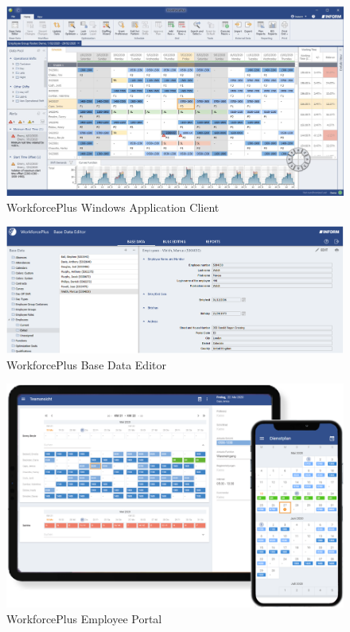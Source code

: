 
\begin{figure}[H]
	\centering	
	\includegraphics[width=.5\textwidth]{img/workforcePlusWindowsApplication.png}
	\caption[WorkforcePlus Windows Application Client]{WorkforcePlus Windows Application Client\cite{clients}}
	\label{fig:workforcePlusClient}
\end{figure}
\begin{figure}[H]
	\centering	
	\includegraphics[width=.5\textwidth]{img/workforcePlusBaseDataEditor.png}
	\caption[WorkforcePlus Base Data Editor]{WorkforcePlus Base Data Editor\cite{clients}}
	\label{fig:workforcePlusBaseDataEditor}
\end{figure}
\begin{figure}[H]
	\centering	
	\includegraphics[width=.5\textwidth]{img/workForcePlusEmployeePortal.png}
	\caption[WorkforcePlus Employee Portal]{WorkforcePlus Employee Portal\cite{clients}}
	\label{fig:workforcePlusEmployeePortal}
\end{figure}